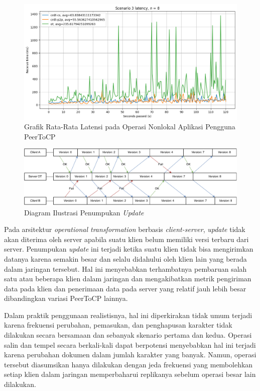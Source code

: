 \begin{figure}
 \centering
 \includegraphics[width=15cm]{./assets/skripsi/benchmark-vis_cell_7_output_5}
 \caption{Grafik Rata-Rata Latensi pada Operasi Nonlokal Aplikasi Pengguna PeerToCP}
 \label{fig:7-5}
\end{figure}

\begin{figure}
 \centering
 \includegraphics[width=15cm]{./assets/skripsi/Snowball}
 \caption{Diagram Ilustrasi Penumpukan \textit{Update}}
 \label{diagram:snowball}
\end{figure}

Pada arsitektur \textit{operational transformation} berbasis \textit{client-server}, \textit{update} tidak akan diterima oleh server apabila suatu klien belum memiliki versi terbaru dari server. Penumpukan \textit{update} ini terjadi ketika suatu klien tidak bisa mengirimkan datanya karena semakin besar dan selalu didahului oleh klien lain yang berada dalam jaringan tersebut. Hal ini menyebabkan terhambatnya pembaruan salah satu atau beberapa klien dalam jaringan dan mengakibatkan metrik pengiriman data pada klien dan penerimaan data pada server yang relatif jauh lebih besar dibandingkan variasi PeerToCP lainnya.

Dalam praktik penggunaan realistisnya, hal ini diperkirakan tidak umum terjadi karena frekuensi perubahan, pemasukan, dan penghapusan karakter tidak dilakukan secara bersamaan dan sebanyak skenario pertama dan kedua. Operasi salin dan tempel secara berkali-kali dapat berpotensi menyebabkan hal ini terjadi karena perubahan dokumen dalam jumlah karakter yang banyak. Namun, operasi tersebut diasumsikan hanya dilakukan dengan jeda frekuensi yang membolehkan setiap klien dalam jaringan memperbaharui replikanya sebelum operasi besar lain dilakukan.

